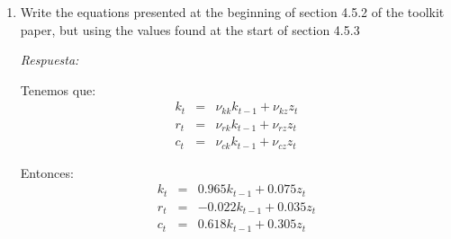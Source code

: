 \documentclass[11pt]{amsart}
\begin{document}
\begin{enumerate}
\item{Write the equations presented at the beginning of section 4.5.2 of the toolkit paper, but using the values found at the start of section 4.5.3}

\medskip
\emph{Respuesta:}

\medskip
Tenemos que:
\begin{eqnarray*}
k_{t} & = & \nu_{kk}k_{t-1}+\nu_{kz}z_{t} \\
r_{t} & = & \nu_{rk}k_{t-1}+\nu_{rz}z_{t} \\
c_{t} & = & \nu_{ck}k_{t-1}+\nu_{cz}z_{t}
\end{eqnarray*}

Entonces:
\begin{eqnarray*}
k_{t} & = & 0.965k_{t-1}+0.075z_{t} \\
r_{t} & = & -0.022k_{t-1}+0.035z_{t} \\
c_{t} & = & 0.618k_{t-1}+0.305z_{t}
\end{eqnarray*}


\end{enumerate}
\end{document}
